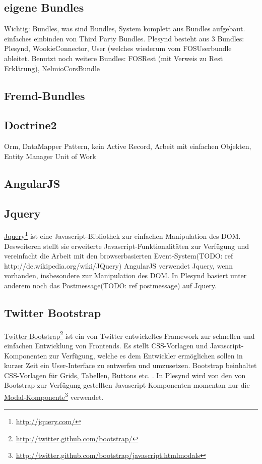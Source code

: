 \subsection{eigene Bundles}\label{section:own_bundles}
Wichtig: Bundles, was sind Bundles, System komplett aus Bundles aufgebaut. einfaches einbinden von Third Party Bundles. Plesynd besteht aus 3 Bundles: Plesynd, WookieConnector, User (welches wiederum vom FOSUserbundle ableitet. Benutzt noch weitere Bundles: FOSRest (mit Verweis zu Rest Erklärung), NelmioCorsBundle
\subsection{Fremd-Bundles}\label{section:third_party_bundles}

\subsection{Doctrine2}\label{section:doctrine2}
Orm, DataMapper Pattern, kein Active Record, Arbeit mit einfachen Objekten, Entity Manager Unit of Work

\subsection{AngularJS}

\subsection{Jquery}
\href{http://jquery.com/}{Jquery}\footnote{\url{http://jquery.com/}} ist eine Javascript-Bibliothek zur einfachen Manipulation des DOM. Desweiteren stellt sie erweiterte Javascript-Funktionalitäten zur Verfügung und vereinfacht die Arbeit mit den browserbasierten Event-System(TODO: ref http://de.wikipedia.org/wiki/JQuery) AngularJS verwendet Jquery, wenn vorhanden, insbesondere zur Manipulation des DOM. In Plesynd basiert unter anderem noch das Postmessage(TODO: ref postmessage) auf Jquery.  

\subsection{Twitter Bootstrap}
\href{http://twitter.github.com/bootstrap/}{Twitter Bootstrap}\footnote{\url{http://twitter.github.com/bootstrap/}} ist ein von Twitter entwickeltes Framework zur schnellen und einfachen Entwicklung von Frontends. Es stellt CSS-Vorlagen und Javascript-Komponenten zur Verfügung, welche es dem Entwickler ermöglichen sollen in kurzer Zeit ein User-Interface zu entwerfen und umzusetzen. Bootstrap beinhaltet CSS-Vorlagen für Grids, Tabellen, Buttons etc. . In Plesynd wird von den von Bootstrap zur Verfügung gestellten Javascript-Komponenten momentan nur die \href{http://twitter.github.com/bootstrap/javascript.htmlmodals}{Modal-Komponente}\footnote{\url{http://twitter.github.com/bootstrap/javascript.htmlmodals}} verwendet. 

